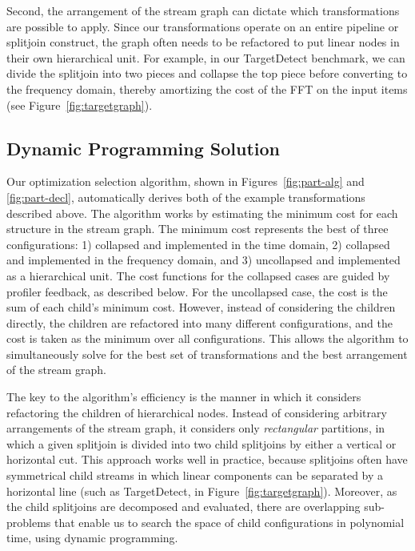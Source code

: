 Second, the arrangement of the stream graph can dictate which
transformations are possible to apply.  Since our transformations
operate on an entire pipeline or splitjoin construct, the
graph often needs to be refactored to put linear nodes in their own
hierarchical unit.  For example, in our TargetDetect benchmark, we can
divide the splitjoin into two pieces and collapse the top piece
before converting to the frequency domain, thereby amortizing the cost
of the FFT on the input items (see Figure~\ref{fig:targetgraph}).

\subsection{Dynamic Programming Solution}

Our optimization selection algorithm, shown in
Figures~\ref{fig:part-alg} and \ref{fig:part-decl}, automatically
derives both of the example transformations described above.  The
algorithm works by estimating the minimum cost for each structure in
the stream graph. The minimum cost represents the best of three
configurations: 1) collapsed and implemented in the time domain, 2)
collapsed and implemented in the frequency domain, and 3) uncollapsed
and implemented as a hierarchical unit.  The cost functions for the
collapsed cases are guided by profiler feedback, as described below.
For the uncollapsed case, the cost is the sum of each child's minimum
cost.  However, instead of considering the children directly, the
children are refactored into many different configurations, and the
cost is taken as the minimum over all configurations.  This allows the
algorithm to simultaneously solve for the best set of transformations
and the best arrangement of the stream graph.

The key to the algorithm's efficiency is the manner in which it
considers refactoring the children of hierarchical nodes.  Instead of
considering arbitrary arrangements of the stream graph, it considers
only {\it rectangular} partitions, in which a given splitjoin is
divided into two child splitjoins by either a vertical or horizontal
cut.  This approach works well in practice, because splitjoins
often have symmetrical child streams in which linear components can be
separated by a horizontal line (such as TargetDetect, in
Figure~\ref{fig:targetgraph}).  Moreover, as the child splitjoins are
decomposed and evaluated, there are overlapping sub-problems that
enable us to search the space of child configurations in polynomial
time, using dynamic programming.

